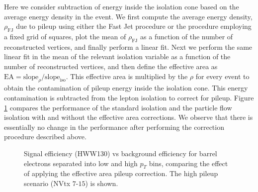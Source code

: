 Here we consider subtraction of energy inside the isolation cone based on the average energy
density in the event. We first compute the average energy density, $\rho_{\mathrm{FJ}}$ due to 
pileup using either the Fast Jet procedure or the procedure employing a fixed grid of squares, 
plot the mean of $\rho_{\mathrm{FJ}}$ as a function of
the number of reconstructed vertices, and finally perform a linear fit. Next we perform the 
same linear fit in the mean of the relevant isolation variable as a function of the number of 
reconstructed vertices, and then define the effective area as 
$\mathrm{EA} = \mathrm{slope}_{\rho} / \mathrm{slope}_{\mathrm{iso}}$. This effective area 
is multiplied by the $\rho$ for every event to obtain the contamination of pileup energy
inside the isolation cone. This energy contamination is subtracted from the lepton isolation
to correct for pileup. Figure \ref{fig:IsoPerformance_EleBarrel_EffectiveAreaCorrection}
compares the performance of the standard isolation and the particle flow isolation with and
without the effective area corrections. We observe that there is essentially no change
in the performance after performing the correction procedure described above.

\begin{figure}[!htbp]
\begin{center}
\caption{Signal efficiency (HWW130) vs background efficiency for barrel electrons separated into 
low and high $p_{T}$ bins, comparing the effect of applying the effective area pileup correction.
The high pileup scenario (NVtx $7$-$15$) is shown.}
\label{fig:IsoPerformance_EleBarrel_EffectiveAreaCorrection}
\end{center}
\end{figure}


